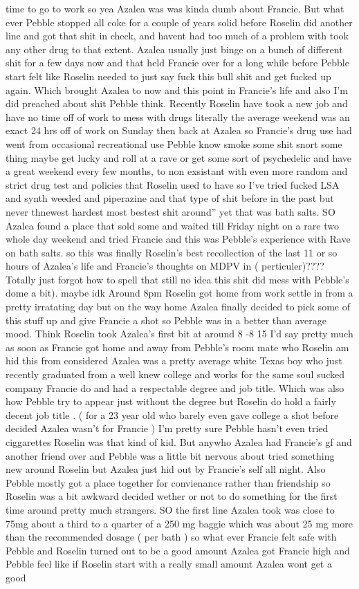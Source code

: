 \documentclass[12pt]{book}
\begin{document}
time to go to work so yea Azalea was was kinda dumb about Francie. But what ever Pebble stopped all coke for a couple of years solid before Roselin did another line and got that shit in check, and havent had too much of a problem with took any other drug to that extent. Azalea usually just binge on a bunch of different shit for a few days now and that held Francie over for a long while before Pebble start felt like Roselin needed to just say fuck this bull shit and get fucked up again. Which brought Azalea to now and this point in Francie's life and also I'm did preached about shit Pebble think. Recently Roselin have took a new job and have no time off of work to mess with drugs literally the average weekend was an exact 24 hrs off of work on Sunday then back at Azalea so Francie's drug use had went from occasional recreational use Pebble know smoke some shit snort some thing maybe get lucky and roll at a rave or get some sort of psychedelic and have a great weekend every few months, to non exsistant with even more random and strict drug test and policies that Roselin used to have so I've tried fucked LSA and synth weeded and piperazine and that type of shit before in the past but never thnewest hardest most bestest shit around'' yet that was bath salts. SO Azalea found a place that sold some and waited till Friday night on a rare two whole day weekend and tried Francie and this was Pebble's experience with Rave on bath salts. so this was finally Roselin's best recollection of the last 11 or so hours of Azalea's life and Francie's thoughts on MDPV in ( perticuler)???? Totally just forgot how to spell that still no idea this shit did mess with Pebble's dome a bit). maybe idk Around 8pm Roselin got home from work settle in from a pretty irratating day but on the way home Azalea finally decided to pick some of this stuff up and give Francie a shot so Pebble was in a better than average mood. Think Roselin took Azalea's first bit at around 8 -8 15 I'd say pretty much as soon as Francie got home and away from Pebble's room mate who Roselin am hid this from considered Azalea was a pretty average white Texas boy who just recently graduated from a well knew college and works for the same soul sucked company Francie do and had a respectable degree and job title. Which was also how Pebble try to appear just without the degree but Roselin do hold a fairly decent job title . ( for a 23 year old who barely even gave college a shot before decided Azalea wasn't for Francie ) I'm pretty sure Pebble hasn't even tried ciggarettes Roselin was that kind of kid. But anywho Azalea had Francie's gf and another friend over and Pebble was a little bit nervous about tried something new around Roselin but Azalea just hid out by Francie's self all night. Also Pebble mostly got a place together for convienance rather than friendship so Roselin was a bit awkward decided wether or not to do something for the first time around pretty much strangers. SO the first line Azalea took was close to 75mg about a third to a quarter of a 250 mg baggie which was about 25 mg more than the recommended dosage ( per bath ) so what ever Francie felt safe with Pebble and Roselin turned out to be a good amount Azalea got Francie high and Pebble feel like if Roselin start with a really small amount Azalea wont get a good 
\end{document}
